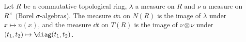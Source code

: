 Let $R$ be a commutative topological ring, $\lambda$ a measure on $R$ and $\nu$ a measure on $R^\times$ (Borel
$\sigma$-algebras). The measure $\dd n$ on $N(R)$ is the image of $\lambda$ under $x\mapsto n(x)$, and the measure
$\dd t$ on $T(R)$ is the image of $\nu\otimes\nu$ under $(t_1,t_2)\mapsto\diag(t_1,t_2)$.
